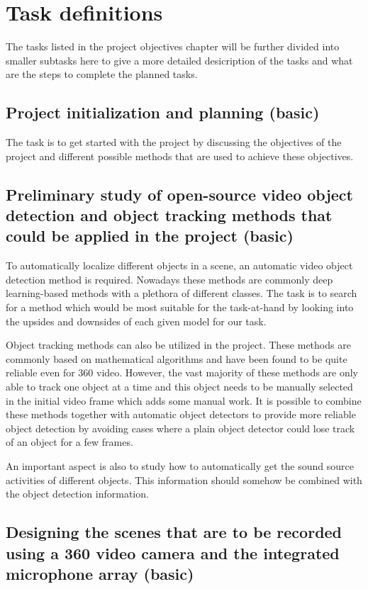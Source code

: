 \section{Task definitions}

The tasks listed in the project objectives chapter will be further divided into smaller subtasks here to give a more detailed desicription of the tasks and what are the steps to complete the planned tasks. 

\subsection{Project initialization and planning (basic)}

The task is to get started with the project by discussing the objectives of the project and different possible
methods that are used to achieve these objectives.

\subsection{Preliminary study of open-source video object detection and object tracking methods that could be applied in the project (basic)}

To automatically localize different objects in a scene, an automatic video object detection method is required.
Nowadays these methods are commonly deep learning-based methods with a plethora of different classes. The task is
to search for a method which would be most suitable for the task-at-hand by looking into the upsides and downsides
of each given model for our task.

Object tracking methods can also be utilized in the project. These methods are commonly based on mathematical 
algorithms and have been found to be quite reliable even for 360 video. However, the vast majority of these 
methods are only able to track one object at a time and this object needs to be manually selected in the initial
video frame which adds some manual work. It is possible to combine these methods together with automatic object
detectors to provide more reliable object detection by avoiding cases where a plain object detector could lose
track of an object for a few frames.

An important aspect is also to study how to automatically get the sound source activities of different objects.
This information should somehow be combined with the object detection information.

\subsection{Designing the scenes that are to be recorded using a 360 video camera and the integrated microphone array (basic)}

